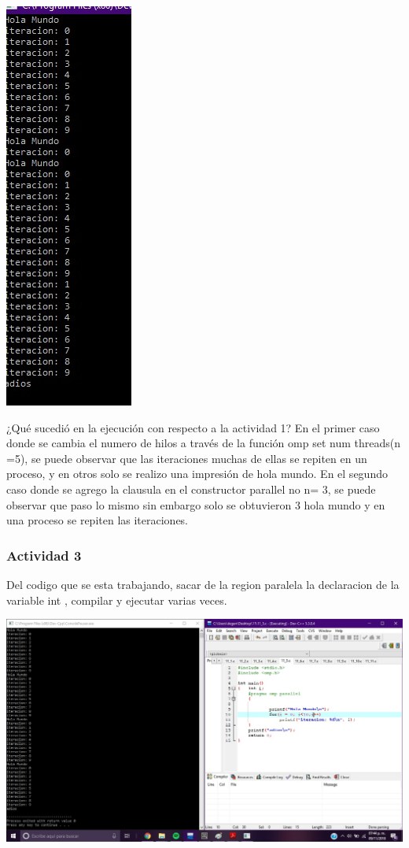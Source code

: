 \documentclass[12pt,letterpaper]{article}
\begin{document}
\begin{flushleft}
\includegraphics[scale=.8]{ejercicio23.jpg} 

\end{flushleft}


¿Qué sucedió en la ejecución con respecto a la actividad 1? En el primer caso donde se cambia el numero de hilos a través de la función omp set num threads(n =5), se puede observar que las iteraciones muchas de ellas se repiten en un proceso, y en otros solo se realizo una impresión de hola mundo. 
En el segundo caso donde se agrego la clausula en el constructor parallel no n= 3, se puede observar que paso lo mismo sin embargo solo se obtuvieron 3 hola mundo y en una proceso se repiten las iteraciones.



\subsubsection*{Actividad 3}

Del codigo que se esta trabajando, sacar de la region paralela la declaracion de la variable int , compilar y ejecutar varias veces.
\begin{flushleft}
\includegraphics[scale=.5]{ejercicio3.jpg} 

\end{flushleft}
\end{document}
